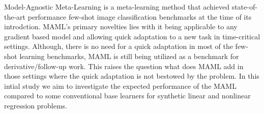 Model-Agnostic Meta-Learning is a meta-learning method that achieved state-of-the-art performance few-shot image classification benchmarks at the time of its introdction. MAML's primary novelties lies with it being applicable to any gradient based model and allowing quick adaptation to a new task in time-critical settings. Although, there is no need for a quick adaptation in most of the few-shot learning benchmarks, MAML is still being utilized as a benchmark for derivative/follow-up work. This raises the question what does MAML add in those settings where the quick adaptation is not bestowed by the problem. In this intial study we aim to investigate the expected performance of the MAML compared to some conventional base learners for synthetic linear and nonlinear regression problems. 


